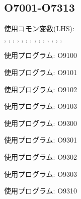 

\clearpage

\subsection{O7001-O7313}
\begin{hosoku}\small
使用コモン変数(LHS):\\
, , , , , , , , , , , , , , 
\end{hosoku}

\begin{hosoku}\small
使用プログラム: O9100
\end{hosoku}

\begin{hosoku}\small
使用プログラム: O9101
\end{hosoku}

\begin{hosoku}\small
使用プログラム: O9102
\end{hosoku}

\begin{hosoku}\small
使用プログラム: O9103
\end{hosoku}

\begin{hosoku}\small
使用プログラム: O9300
\end{hosoku}

\begin{hosoku}\small
使用プログラム: O9301
\end{hosoku}

\begin{hosoku}\small
使用プログラム: O9302
\end{hosoku}

\begin{hosoku}\small
使用プログラム: O9303
\end{hosoku}

\begin{hosoku}\small
使用プログラム: O9310
\end{hosoku}

